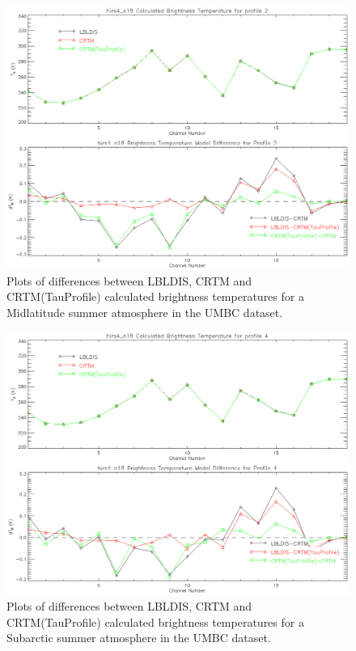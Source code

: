 \begin{figure}[htp]
  \centering{}
  \includegraphics[scale=0.8]{./graphics/MidLat_Summer_02.eps}
  \caption{Plots of differences between LBLDIS, CRTM and CRTM(TauProfile) calculated brightness temperatures for
   a Midlatitude summer atmosphere in the UMBC dataset.}
  \label{fig:Midlatitude_Summer_Dep}
\end{figure}

\begin{figure}[htp]
  \centering{}
  \includegraphics[scale=0.8]{./graphics/SubArc_Summer_04.eps}
  \caption{Plots of differences between LBLDIS, CRTM and CRTM(TauProfile) calculated brightness temperatures for
   a Subarctic summer atmosphere in the UMBC dataset.}
  \label{fig:Subarctic_Summer_Dep}
\end{figure}

